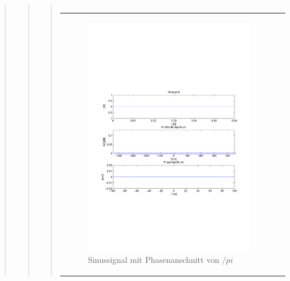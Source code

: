 \begin{quote}
\begin{quote}
\begin{quote}
\begin{center}
\begin{tabular}{ll}
                \end{tabular}
                \end{center}
                
                \begin{center}
                \begin{tabular}{ll}
    
                \hspace{-4em}
                    \begin{minipage}{0.6\textwidth}
    
                        \begin{figure}[H]
                            \label{fig:}
                            \includegraphics[scale=0.5, trim = 1.5cm 7cm 1.5cm 8.5cm,
                            clip]{./Bilder/Phasenanschnitt88pi.pdf} %
                            \caption{Sinussignal mit Phasenanschnitt von $/pi$}
                        \end{figure}
    

\end{minipage}
\end{tabular}
\end{center}
\end{quote}
\end{quote}
\end{quote}
